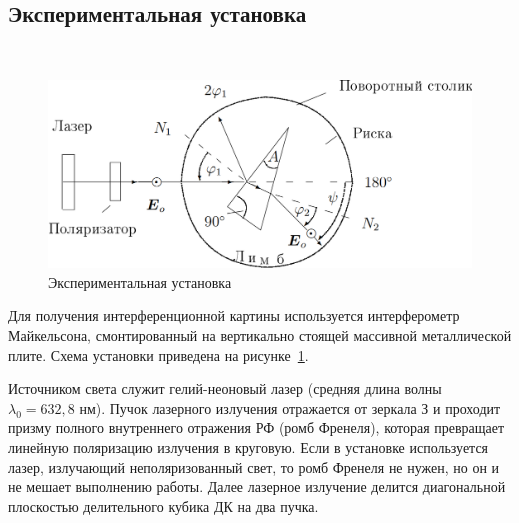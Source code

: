 \documentclass[12pt]{article}
\begin{document}
    \subsection*{Экспериментальная установка}
    \ \par
    \begin{figure}
        \includegraphics[width=\linewidth]{pic/setup}
        \caption{Экспериментальная установка}
        \label{fig:fig2}
    \end{figure}

    Для получения интерференционной картины используется интерферометр Майкельсона,
    смонтированный на вертикально стоящей массивной металлической плите.
    Схема установки приведена на рисунке\ \ref{fig:fig2}.

    Источником света служит гелий-неоновый лазер (средняя длина
    волны $ \lambda_0 = 632,8 $ нм).
    Пучок лазерного излучения отражается от зеркала З и проходит призму полного внутреннего отражения
    РФ (ромб Френеля), которая превращает линейную поляризацию излучения в круговую.
    Если в установке используется лазер, излучающий неполяризованный свет, то ромб Френеля не нужен,
    но он и не мешает выполнению работы.
    Далее лазерное излучение делится диагональной плоскостью делительного кубика ДК на два пучка.
\end{document}
